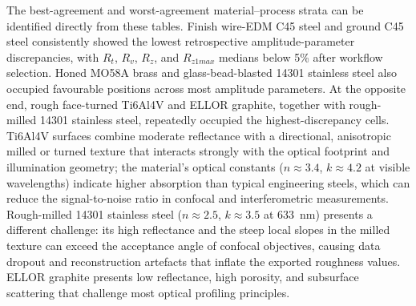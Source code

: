 \documentclass{article}
\begin{document}
The best-agreement and worst-agreement material--process strata can be identified directly from these tables. Finish wire-EDM C45 steel and ground C45 steel consistently showed the lowest retrospective amplitude-parameter discrepancies, with $R_t$, $R_v$, $R_z$, and $R_{z1max}$ medians below 5\% after workflow selection. Honed MO58A brass and glass-bead-blasted 14301 stainless steel also occupied favourable positions across most amplitude parameters. At the opposite end, rough face-turned Ti6Al4V and ELLOR graphite, together with rough-milled 14301 stainless steel, repeatedly occupied the highest-discrepancy cells. Ti6Al4V surfaces combine moderate reflectance with a directional, anisotropic milled or turned texture that interacts strongly with the optical footprint and illumination geometry; the material's optical constants ($n \approx 3.4$, $k \approx 4.2$ at visible wavelengths) indicate higher absorption than typical engineering steels, which can reduce the signal-to-noise ratio in confocal and interferometric measurements. Rough-milled 14301 stainless steel ($n \approx 2.5$, $k \approx 3.5$ at 633~nm) presents a different challenge: its high reflectance and the steep local slopes in the milled texture can exceed the acceptance angle of confocal objectives, causing data dropout and reconstruction artefacts that inflate the exported roughness values. ELLOR graphite presents low reflectance, high porosity, and subsurface scattering that challenge most optical profiling principles. 
\end{document}
